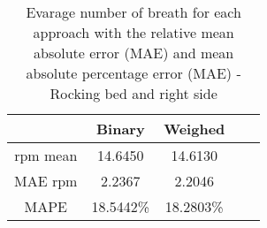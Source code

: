
\begin{table}[h]

    \centering

\begin{tabular}{|c|c|c|c|c|}
\hline 
& Binary & Weighed \\ 
 
\hline 
rpm mean & 14.6450  & 14.6130    \\  
MAE rpm   &   2.2367&     2.2046\\ 
MAPE   & 18.5442\% &  18.2803\% \\ 

\hline 
\end{tabular}
\caption{Evarage number of breath for each approach with the relative mean
absolute error (MAE) and mean absolute percentage error (MAE) - Rocking bed
and right side}
\label{tab:RightRockingMetricssg}
\end{table}